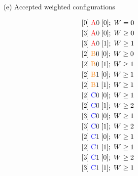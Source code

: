 \begin{figure}[h]
\begin{minipage}[t]{0.30\textwidth}
    \end{minipage}
    \hfill
    \begin{minipage}[t]{0.32\textwidth}
        \raggedright
        (e) Accepted weighted configurations \\
        \vspace{-1em}
        \footnotesize
        \begin{minipage}[t]{0.48\textwidth}
            \begin{align*}
                 & [0]\; \text{\stateA}0\; [0];\; W = 0    \\
                 & [3]\; \text{\stateA}0\; [0];\; W \geq 0 \\
                 & [3]\; \text{\stateA}0\; [1];\; W \geq 1 \\
                 & [2]\; \text{\stateB}0\; [0];\; W \geq 0 \\
                 & [2]\; \text{\stateB}0\; [1];\; W \geq 1 \\
                 & [2]\; \text{\stateB}1\; [0];\; W \geq 1 \\
                 & [2]\; \text{\stateB}1\; [1];\; W \geq 1 \\
                 & [2]\; \text{\stateC}0\; [0];\; W \geq 1 \\
                 & [2]\; \text{\stateC}0\; [1];\; W \geq 2 \\
                 & [3]\; \text{\stateC}0\; [0];\; W \geq 1 \\
                 & [3]\; \text{\stateC}0\; [1];\; W \geq 2 \\
                 & [2]\; \text{\stateC}1\; [0];\; W \geq 1 \\
                 & [2]\; \text{\stateC}1\; [1];\; W \geq 1 \\
                 & [3]\; \text{\stateC}1\; [0];\; W \geq 2 \\
                 & [3]\; \text{\stateC}1\; [1];\; W \geq 1 \\
            \end{align*}
        \end{minipage}
        \hfill
        \vrule width 0.5pt
        \hfill
        \begin{minipage}[t]{0.48\textwidth}
            \begin{align*}

\end{align*}
\end{minipage}
\end{minipage}
\end{figure}
